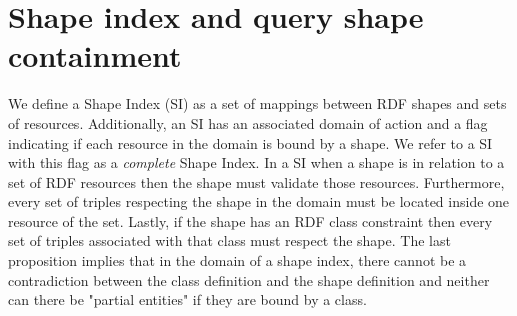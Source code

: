 \section{Shape index and query shape containment}

We define a Shape Index (SI) as a set of mappings between RDF shapes and sets of resources.
Additionally, an SI has an associated domain of action
and a flag indicating if each resource in the domain is bound by a shape. 
We refer to a SI with this flag as a \emph{complete} Shape Index.
In a SI when a shape is in relation to a set of RDF resources then the shape must validate those resources.
Furthermore, every set of triples respecting the shape in the domain must be located inside one resource of the set.
Lastly, if the shape has an RDF class constraint
then every set of triples associated with that class must respect the shape.
The last proposition implies that in the domain of a shape index, there cannot be a contradiction
between the class definition and the shape definition and neither can there be "partial entities" if they
are bound by a class.